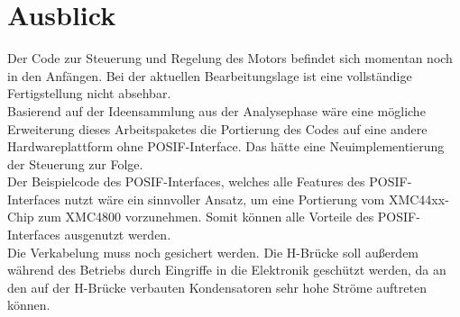\section{Ausblick}
Der Code zur Steuerung und Regelung des Motors befindet sich momentan noch in den Anfängen. Bei der aktuellen Bearbeitungslage ist eine vollständige Fertigstellung nicht absehbar. \\
Basierend auf der Ideensammlung aus der Analysephase wäre eine mögliche Erweiterung dieses Arbeitspaketes die Portierung des Codes auf eine andere Hardwareplattform ohne POSIF-Interface. Das hätte eine Neuimplementierung der Steuerung zur Folge. \\
Der Beispielcode des POSIF-Interfaces, welches alle Features des POSIF-Interfaces nutzt wäre ein sinnvoller Ansatz, um eine Portierung vom XMC44xx-Chip zum XMC4800 vorzunehmen. Somit können alle Vorteile des POSIF-Interfaces ausgenutzt werden. \\
Die Verkabelung muss noch gesichert werden. Die H-Brücke soll außerdem während des Betriebs durch Eingriffe in die Elektronik geschützt werden, da an den auf der H-Brücke verbauten Kondensatoren sehr hohe Ströme auftreten können. 

